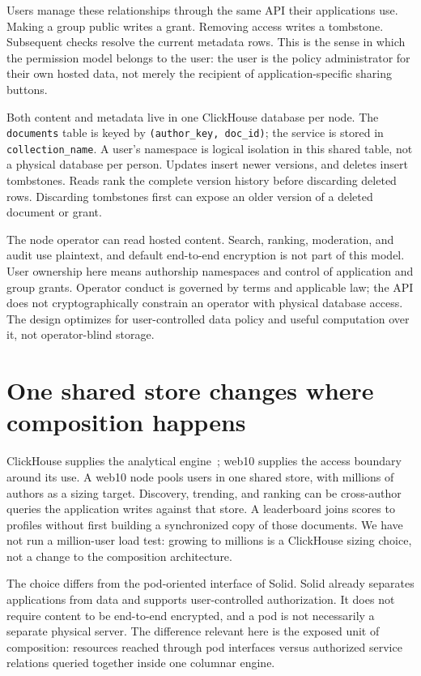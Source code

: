 \documentclass[sigconf, nonacm]{acmart}
\begin{document}
Users manage these relationships through the same API their applications
use. Making a group public writes a grant. Removing access writes a
tombstone. Subsequent checks resolve the current metadata rows. This is
the sense in which the permission model belongs to the user: the user is
the policy administrator for their own hosted data, not merely the
recipient of application-specific sharing buttons.

Both content and metadata live in one ClickHouse database per node.
The \texttt{documents} table is keyed by \texttt{(author\_key, doc\_id)};
the service is stored in \texttt{collection\_name}. A user's namespace is
logical isolation in this shared table, not a physical database per
person. Updates insert newer versions, and deletes insert tombstones.
Reads rank the complete version history before discarding deleted rows.
Discarding tombstones first can expose an older version of a deleted
document or grant.

The node operator can read hosted content. Search, ranking, moderation,
and audit use plaintext, and default end-to-end encryption is not part
of this model. User ownership here means authorship namespaces and
control of application and group grants. Operator conduct is governed
by terms and applicable law; the API does not cryptographically constrain
an operator with physical database access. The design optimizes for
user-controlled data policy and useful computation over it, not
operator-blind storage.

\section{One shared store changes where composition happens}
\label{sec:store}

ClickHouse supplies the analytical engine~\cite{clickhouse2024}; web10
supplies the access boundary around its use. A web10 node pools users in
one shared store, with millions of authors as a sizing target. Discovery,
trending, and ranking can be cross-author queries the application writes
against that store. A leaderboard joins scores to profiles without first
building a synchronized copy of those documents. We have not run a
million-user load test: growing to millions is a ClickHouse sizing choice,
not a change to the composition architecture.

The choice differs from the pod-oriented interface of Solid.
Solid already separates applications from data and supports
user-controlled authorization. It does not require content to be
end-to-end encrypted, and a pod is not necessarily a separate physical
server. The difference relevant here is the exposed unit of composition:
resources reached through pod interfaces versus authorized service
relations queried together inside one columnar engine.
\end{document}
